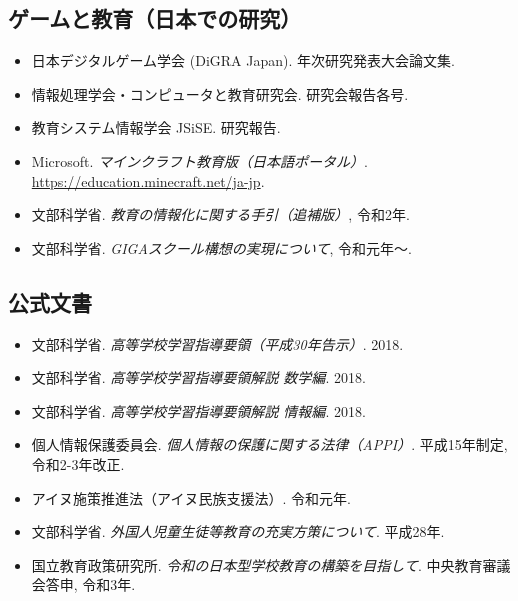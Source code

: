 \documentclass[12pt,a4paper]{scrartcl}
\begin{document}
\subsection{ゲームと教育（日本での研究）}
\begin{itemize}[leftmargin=1.3em,itemsep=0.15em,topsep=0.3em]
  \item 日本デジタルゲーム学会 (DiGRA Japan). 年次研究発表大会論文集.
  \item 情報処理学会・コンピュータと教育研究会. 研究会報告各号.
  \item 教育システム情報学会 JSiSE. 研究報告.
  \item Microsoft. \emph{マインクラフト教育版（日本語ポータル）}. \url{https://education.minecraft.net/ja-jp}.
  \item 文部科学省. \emph{教育の情報化に関する手引（追補版）}, 令和2年.
  \item 文部科学省. \emph{GIGAスクール構想の実現について}, 令和元年〜.
\end{itemize}

\subsection{公式文書}
\begin{itemize}[leftmargin=1.3em,itemsep=0.15em,topsep=0.3em]
  \item 文部科学省. \emph{高等学校学習指導要領（平成30年告示）}. 2018.
  \item 文部科学省. \emph{高等学校学習指導要領解説 数学編}. 2018.
  \item 文部科学省. \emph{高等学校学習指導要領解説 情報編}. 2018.
  \item 個人情報保護委員会. \emph{個人情報の保護に関する法律（APPI）}. 平成15年制定, 令和2-3年改正.
  \item アイヌ施策推進法（アイヌ民族支援法）. 令和元年.
  \item 文部科学省. \emph{外国人児童生徒等教育の充実方策について}. 平成28年.
  \item 国立教育政策研究所. \emph{令和の日本型学校教育の構築を目指して}. 中央教育審議会答申, 令和3年.
\end{itemize}
\end{document}
